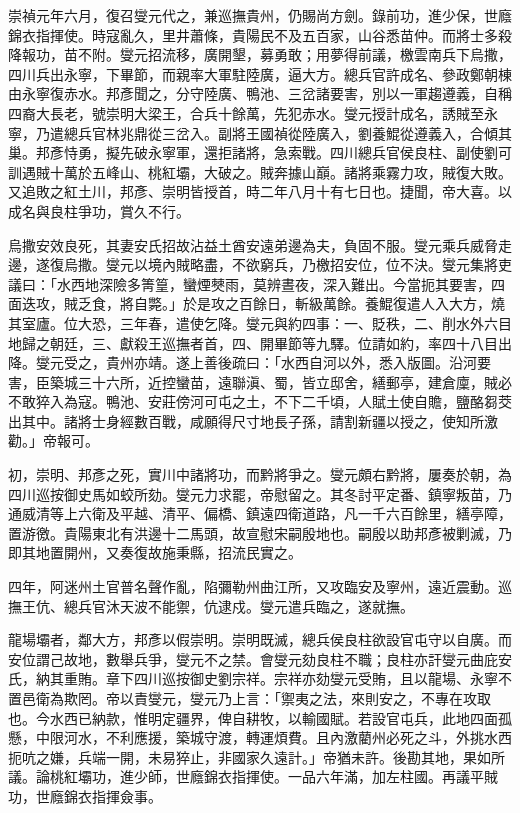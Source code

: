 \begin{pinyinscope}
{{崇禎元年六月，復召燮元代之，兼巡撫貴州，仍賜尚方劍。錄前功，進少保，世廕錦衣指揮使。時寇亂久，里井蕭條，貴陽民不及五百家，山谷悉苗仲。而將士多殺降報功，苗不附。燮元招流移，廣開墾，募勇敢；用夢得前議，檄雲南兵下烏撒，四川兵出永寧，下畢節，而親率大軍駐陸廣，逼大方。總兵官許成名、參政鄭朝棟由永寧復赤水。邦彥聞之，分守陸廣、鴨池、三岔諸要害，別以一軍趨遵義，自稱四裔大長老，號崇明大梁王，合兵十餘萬，先犯赤水。燮元授計成名，誘賊至永寧，乃遣總兵官林兆鼎從三岔入。副將王國禎從陸廣入，劉養鯤從遵義入，合傾其巢。邦彥恃勇，擬先破永寧軍，還拒諸將，急索戰。四川總兵官侯良柱、副使劉可訓遇賊十萬於五峰山、桃紅壩，大破之。賊奔據山巔。諸將乘霧力攻，賊復大敗。又追敗之紅土川，邦彥、崇明皆授首，時二年八月十有七日也。捷聞，帝大喜。以成名與良柱爭功，賞久不行。

烏撒安效良死，其妻安氏招故沾益土酋安遠弟邊為夫，負固不服。燮元乘兵威脅走邊，遂復烏撒。燮元以境內賊略盡，不欲窮兵，乃檄招安位，位不決。燮元集將吏議曰：「水西地深險多箐篁，蠻煙僰雨，莫辨晝夜，深入難出。今當扼其要害，四面迭攻，賊乏食，將自斃。」於是攻之百餘日，斬級萬餘。養鯤復遣人入大方，燒其室廬。位大恐，三年春，遣使乞降。燮元與約四事：一、貶秩，二、削水外六目地歸之朝廷，三、獻殺王巡撫者首，四、開畢節等九驛。位請如約，率四十八目出降。燮元受之，貴州亦靖。遂上善後疏曰：「水西自河以外，悉入版圖。沿河要害，臣築城三十六所，近控蠻苗，遠聯滇、蜀，皆立邸舍，繕郵亭，建倉廩，賊必不敢猝入為寇。鴨池、安莊傍河可屯之土，不下二千頃，人賦土使自贍，鹽酪芻茭出其中。諸將士身經數百戰，咸願得尺寸地長子孫，請割新疆以授之，使知所激勸。」帝報可。

初，崇明、邦彥之死，實川中諸將功，而黔將爭之。燮元頗右黔將，屢奏於朝，為四川巡按御史馬如蛟所劾。燮元力求罷，帝慰留之。其冬討平定番、鎮寧叛苗，乃通威清等上六衛及平越、清平、偏橋、鎮遠四衛道路，凡一千六百餘里，繕亭障，置游徼。貴陽東北有洪邊十二馬頭，故宣慰宋嗣殷地也。嗣殷以助邦彥被剿滅，乃即其地置開州，又奏復故施秉縣，招流民實之。

四年，阿迷州土官普名聲作亂，陷彌勒州曲江所，又攻臨安及寧州，遠近震動。巡撫王伉、總兵官沐天波不能禦，伉逮戍。燮元遣兵臨之，遂就撫。

龍場壩者，鄰大方，邦彥以假崇明。崇明既滅，總兵侯良柱欲設官屯守以自廣。而安位謂己故地，數舉兵爭，燮元不之禁。會燮元劾良柱不職；良柱亦訐燮元曲庇安氏，納其重賄。章下四川巡按御史劉宗祥。宗祥亦劾燮元受賄，且以龍場、永寧不置邑衛為欺罔。帝以責燮元，燮元乃上言：「禦夷之法，來則安之，不專在攻取也。今水西已納款，惟明定疆界，俾自耕牧，以輸國賦。若設官屯兵，此地四面孤懸，中限河水，不利應援，築城守渡，轉運煩費。且內激藺州必死之斗，外挑水西扼吭之嫌，兵端一開，未易猝止，非國家久遠計。」帝猶未許。後勘其地，果如所議。論桃紅壩功，進少師，世廕錦衣指揮使。一品六年滿，加左柱國。再議平賊功，世廕錦衣指揮僉事。

}}
\end{pinyinscope}
